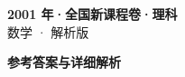 \documentclass[zihao=-4, a4paper]{ctexart}
\begin{document}
\begin{center}
  {\Large\bfseries 2001 年·全国新课程卷·理科}\\[4pt]
  {\large 数学 · 解析版}
\end{center}
\medskip
{}

\clearpage
{}
\begin{center}{\Large\bfseries 参考答案与详细解析}\end{center}
\medskip

\end{document}
